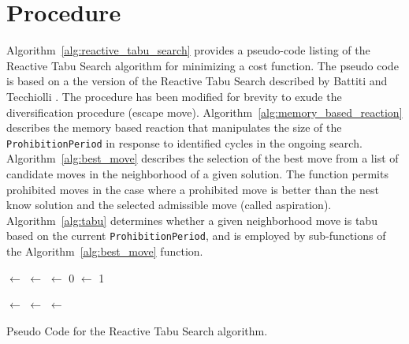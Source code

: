 \documentclass[a4paper, 11pt]{article}
\begin{document}
\section{Procedure}
\label{sec:procedure}
Algorithm~\ref{alg:reactive_tabu_search} provides a pseudo-code listing of the Reactive Tabu Search algorithm for minimizing a cost function. 
The pseudo code is based on a the version of the Reactive Tabu Search described by Battiti and Tecchiolli \cite{Battiti1995a}. The procedure has been modified for brevity to exude the diversification procedure (escape move). Algorithm~\ref{alg:memory_based_reaction} describes the memory based reaction that manipulates the size of the \texttt{ProhibitionPeriod} in response to identified cycles in the ongoing search. Algorithm~\ref{alg:best_move} describes the selection of the best move from a list of candidate moves in the neighborhood of a given solution. The function permits prohibited moves in the case where a prohibited move is better than the nest know solution and the selected admissible move (called aspiration). Algorithm~\ref{alg:tabu} determines whether a given neighborhood move is tabu based on the current \texttt{ProhibitionPeriod}, and is employed by sub-functions of the Algorithm~\ref{alg:best_move} function.

\begin{algorithm}[ht]
	\SetLine
	\KwIn{\MaxIterations, \Increase, \Decrease, \ProblemSize}
	\KwOut{\Best}
	\Current $\leftarrow$ \ConstructInitialSolution{}\;
	\Best $\leftarrow$ \Current\;
	\TabuList $\leftarrow$ 0\;
	\ProhibitionPeriod $\leftarrow$ 1\;
	
	\ForEach{\CurrentIteration $\in$ \MaxIterations} {
		\MemoryBasedReaction{\Increase, \Decrease, \ProblemSize}\;
		\CandidateList $\leftarrow$ \GenerateCandidateNeighborhood{\Current}\;
		\Current $\leftarrow$ \BestMove{\CandidateList}\;
		\TabuList $\leftarrow$ \CurrentFeature\;
		\If{\Cost{\Current} $\leq$ \Cost{\Best}}{
			\Best $\leftarrow$ \Current\;
		}
	}
	\Return{\Best}\;
	\caption{Pseudo Code for the Reactive Tabu Search algorithm.}
	\label{alg:reactive_tabu_search}
\end{algorithm}
\end{document}
